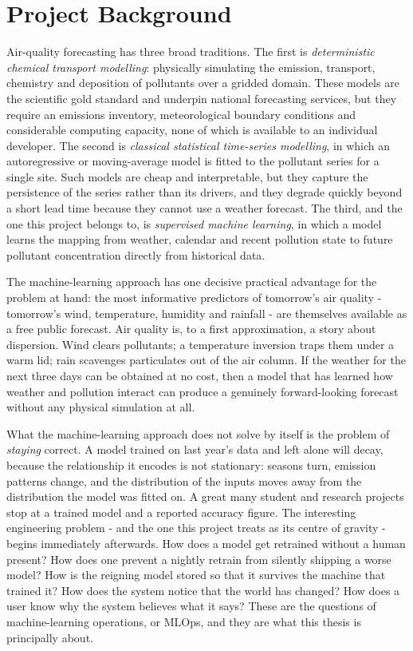 \section{Project Background}
Air-quality forecasting has three broad traditions. The first is
\emph{deterministic chemical transport modelling}: physically simulating the
emission, transport, chemistry and deposition of pollutants over a gridded
domain. These models are the scientific gold standard and underpin national
forecasting services, but they require an emissions inventory, meteorological
boundary conditions and considerable computing capacity, none of which is
available to an individual developer. The second is \emph{classical statistical
time-series modelling}, in which an autoregressive or moving-average model is
fitted to the pollutant series for a single site. Such models are cheap and
interpretable, but they capture the persistence of the series rather than its
drivers, and they degrade quickly beyond a short lead time because they cannot
use a weather forecast. The third, and the one this project belongs to, is
\emph{supervised machine learning}, in which a model learns the mapping from
weather, calendar and recent pollution state to future pollutant concentration
directly from historical data.

The machine-learning approach has one decisive practical advantage for the
problem at hand: the most informative predictors of tomorrow's air quality -
tomorrow's wind, temperature, humidity and rainfall - are themselves available
as a free public forecast. Air quality is, to a first approximation, a story
about dispersion. Wind clears pollutants; a temperature inversion traps them
under a warm lid; rain scavenges particulates out of the air column. If the
weather for the next three days can be obtained at no cost, then a model that has
learned how weather and pollution interact can produce a genuinely forward-looking
forecast without any physical simulation at all.

What the machine-learning approach does not solve by itself is the problem of
\emph{staying} correct. A model trained on last year's data and left alone will
decay, because the relationship it encodes is not stationary: seasons turn,
emission patterns change, and the distribution of the inputs moves away from the
distribution the model was fitted on. A great many student and research projects
stop at a trained model and a reported accuracy figure. The interesting
engineering problem - and the one this project treats as its centre of gravity
- begins immediately afterwards. How does a model get retrained without a human
present? How does one prevent a nightly retrain from silently shipping a worse
model? How is the reigning model stored so that it survives the machine that
trained it? How does the system notice that the world has changed? How does a
user know why the system believes what it says? These are the questions of
machine-learning operations, or MLOps, and they are what this thesis is
principally about.

